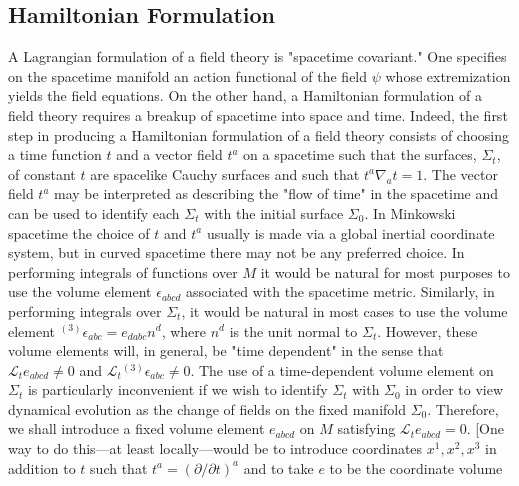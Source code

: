 
\subsection{Hamiltonian Formulation}\label{sec:E.2}

A Lagrangian formulation of a field theory is "spacetime covariant." One specifies
on the spacetime manifold an action functional of the field \(\psi\) whose
extremization yields the field equations. On the other hand, a Hamiltonian
formulation of a field theory requires a breakup of spacetime into space and time.
Indeed, the first step in producing a Hamiltonian formulation of a field theory
consists of choosing a time function \(t\) and a vector field \(t^a\) on a spacetime
such that the surfaces, \(\Sigma_t\), of constant \(t\) are spacelike Cauchy surfaces
and such that \(t^a\nabla_a t=1\). The vector field \(t^a\) may be interpreted as
describing the "flow of time" in the spacetime and can be used to identify each
\(\Sigma_t\) with the initial surface \(\Sigma_0\). In Minkowski spacetime the choice
of \(t\) and \(t^a\) usually is made via a global inertial coordinate system, but in
curved spacetime there may not be any preferred choice. In performing integrals of
functions over \(M\) it would be natural for most purposes to use the volume element
\(\epsilon_{abcd}\) associated with the spacetime metric. Similarly, in performing
integrals over \(\Sigma_t\), it would be natural in most cases to use the volume
element \({}^{(3)}\epsilon_{abc}=e_{dabc}n^d\), where \(n^d\) is the unit normal to
\(\Sigma_t\). However, these volume elements will, in general, be "time dependent"
in the sense that \(\mathcal L_t e_{abcd}\ne0\) and
\(\mathcal L_t{}^{(3)}\epsilon_{abc}\ne0\). The use of a time-dependent volume
element on \(\Sigma_t\) is particularly inconvenient if we wish to identify
\(\Sigma_t\) with \(\Sigma_0\) in order to view dynamical evolution as the change of
fields on the fixed manifold \(\Sigma_0\). Therefore, we shall introduce a fixed
volume element \(e_{abcd}\) on \(M\) satisfying \(\mathcal L_t e_{abcd}=0\). [One
way to do this---at least locally---would be to introduce coordinates
\(x^1,x^2,x^3\) in addition to \(t\) such that
\(t^a=(\partial/\partial t)^a\) and to take \(e\) to be the coordinate volume
